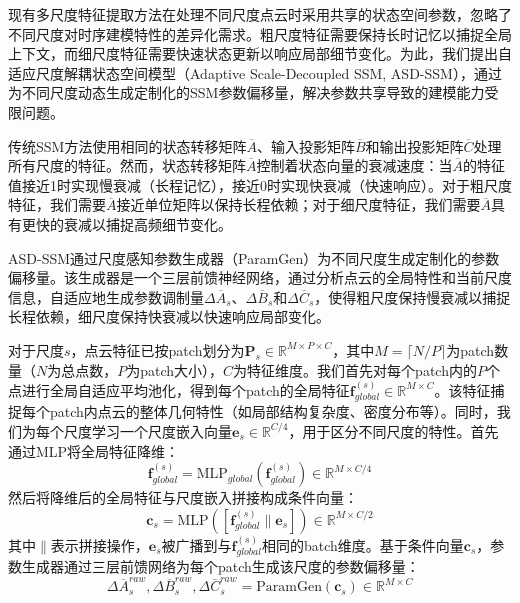 \documentclass[preprint,12pt]{elsarticle}
\begin{document}
现有多尺度特征提取方法在处理不同尺度点云时采用共享的状态空间参数，忽略了不同尺度对时序建模特性的差异化需求。粗尺度特征需要保持长时记忆以捕捉全局上下文，而细尺度特征需要快速状态更新以响应局部细节变化。为此，我们提出自适应尺度解耦状态空间模型（Adaptive Scale-Decoupled SSM, ASD-SSM），通过为不同尺度动态生成定制化的SSM参数偏移量，解决参数共享导致的建模能力受限问题。

传统SSM方法使用相同的状态转移矩阵$\overline{A}$、输入投影矩阵$\overline{B}$和输出投影矩阵$\overline{C}$处理所有尺度的特征。然而，状态转移矩阵$\overline{A}$控制着状态向量的衰减速度：当$\overline{A}$的特征值接近1时实现慢衰减（长程记忆），接近0时实现快衰减（快速响应）。对于粗尺度特征，我们需要$\overline{A}$接近单位矩阵以保持长程依赖；对于细尺度特征，我们需要$\overline{A}$具有更快的衰减以捕捉高频细节变化。

ASD-SSM通过尺度感知参数生成器（ParamGen）为不同尺度生成定制化的参数偏移量。该生成器是一个三层前馈神经网络，通过分析点云的全局特性和当前尺度信息，自适应地生成参数调制量$\Delta\overline{A}_s$、$\Delta\overline{B}_s$和$\Delta\overline{C}_s$，使得粗尺度保持慢衰减以捕捉长程依赖，细尺度保持快衰减以快速响应局部变化。

对于尺度$s$，点云特征已按patch划分为$\mathbf{P}_s \in \mathbb{R}^{M \times P \times C}$，其中$M = \lceil N/P \rceil$为patch数量（$N$为总点数，$P$为patch大小），$C$为特征维度。我们首先对每个patch内的$P$个点进行全局自适应平均池化，得到每个patch的全局特征$\mathbf{f}_{global}^{(s)} \in \mathbb{R}^{M \times C}$。该特征捕捉每个patch内点云的整体几何特性（如局部结构复杂度、密度分布等）。同时，我们为每个尺度学习一个尺度嵌入向量$\mathbf{e}_s \in \mathbb{R}^{C/4}$，用于区分不同尺度的特性。首先通过MLP将全局特征降维：
\begin{equation}
	\mathbf{f}_{global}^{(s)} = \text{MLP}_{global}(\mathbf{f}_{global}^{(s)}) \in \mathbb{R}^{M \times C/4}
\end{equation}
然后将降维后的全局特征与尺度嵌入拼接构成条件向量：
\begin{equation}
	\mathbf{c}_s = \text{MLP}([\mathbf{f}_{global}^{(s)} \| \mathbf{e}_s]) \in \mathbb{R}^{M \times C/2}
\end{equation}
其中$\|$表示拼接操作，$\mathbf{e}_s$被广播到与$\mathbf{f}_{global}^{(s)}$相同的batch维度。基于条件向量$\mathbf{c}_s$，参数生成器通过三层前馈网络为每个patch生成该尺度的参数偏移量：
\begin{equation}
	\Delta\overline{A}_s^{raw}, \Delta\overline{B}_s^{raw}, \Delta\overline{C}_s^{raw} = \text{ParamGen}(\mathbf{c}_s) \in \mathbb{R}^{M \times C}
\end{equation}
\end{document}
